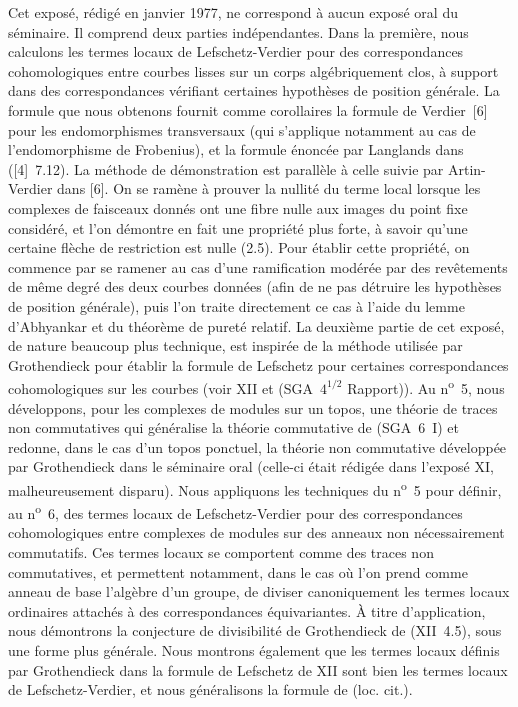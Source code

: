 \documentclass[11pt]{article}
\begin{document}
Cet exposé, rédigé en janvier 1977, ne correspond à aucun exposé oral du séminaire. Il comprend deux parties indépendantes. Dans la première, nous calculons les termes locaux de Lefschetz-Verdier pour des correspondances cohomologiques entre courbes lisses sur un corps algébriquement clos, à support dans des correspondances vérifiant certaines hypothèses de position générale. La formule que nous obtenons fournit comme corollaires la formule de Verdier~[6] pour les endomorphismes transversaux (qui s'applique notamment au cas de l'endomorphisme de Frobenius), et la formule énoncée par Langlands dans ([4]~7.12). La méthode de démonstration est parallèle à celle suivie par Artin-Verdier dans [6]. On se ramène à prouver la nullité du terme local lorsque les complexes de faisceaux donnés ont une fibre nulle aux images du point fixe considéré, et l'on démontre en fait une propriété plus forte, à savoir qu'une certaine flèche de restriction est nulle (2.5). Pour établir cette propriété, on commence par se ramener au cas d'une ramification modérée par des revêtements de même degré des deux courbes données (afin de ne pas détruire les hypothèses de position générale), puis l'on traite directement ce cas à l'aide du lemme d'Abhyankar et du théorème de pureté relatif. La deuxième partie de cet exposé, de nature beaucoup plus technique, est inspirée de la méthode utilisée par Grothendieck pour établir la formule de Lefschetz pour certaines correspondances cohomologiques sur les courbes (voir XII et (SGA~$4^{1/2}$ Rapport)). Au n\textsuperscript{o}~5, nous développons, pour les complexes de modules sur un topos, une théorie de traces non commutatives qui généralise la théorie commutative de (SGA~6~I) et redonne, dans le cas d'un topos ponctuel, la théorie non commutative développée par Grothendieck dans le séminaire oral (celle-ci était rédigée dans l'exposé XI, malheureusement disparu). Nous appliquons les techniques du n\textsuperscript{o}~5 pour définir, au n\textsuperscript{o}~6, des termes locaux de Lefschetz-Verdier pour des correspondances cohomologiques entre complexes de modules sur des
anneaux non nécessairement commutatifs. Ces termes locaux se comportent comme des traces non commutatives, et permettent notamment, dans le cas où l'on prend comme anneau de base l'algèbre d'un groupe, de diviser canoniquement les termes locaux ordinaires attachés à des correspondances équivariantes. À titre d'application, nous démontrons la conjecture de divisibilité de Grothendieck de (XII~4.5), sous une forme plus générale. Nous montrons également que les termes locaux définis par Grothendieck dans la formule de Lefschetz de XII sont bien les termes locaux de Lefschetz-Verdier, et nous généralisons la formule de (loc. cit.).
\end{document}
